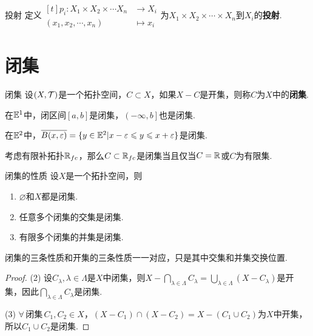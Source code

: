 \begin{definition}{投射}
    定义$\begin{aligned}[t]
        p_i: X_1\times X_2\times\cdots X_n &\to X_i \\
        (x_1,x_2,\cdots,x_n) &\mapsto x_i
    \end{aligned}$为$X_1\times X_2\times\cdots\times X_n$到$X_i$的\textbf{投射}.
\end{definition}

\section{闭集}

\begin{definition}{闭集}
    设$(X,\mathcal{T})$是一个拓扑空间，$C\subset X$，如果$X-C$是开集，则称$C$为$X$中的\textbf{闭集}.
\end{definition}

\begin{instance}
    在$\mathbb{E}^1$中，闭区间$\left[a,b\right]$是闭集，$\left(-\infty,b\right]$也是闭集.\par
    在$\mathbb{E}^2$中，$\overline{B(x,\varepsilon)}=\{y\in\mathbb{E}^2|x-\varepsilon\leqslant y\leqslant x+\varepsilon\}$是闭集.
\end{instance}

\begin{instance}
    考虑有限补拓扑$\mathbb{R}_{fc}$，那么$C\subset\mathbb{R}_{fc}$是闭集当且仅当$C=\mathbb{R}$或$C$为有限集.
\end{instance}


\begin{proposition}{闭集的性质}
    设$X$是一个拓扑空间，则
    \begin{enumerate}
        \item $\varnothing$和$X$都是闭集.
        \item 任意多个闭集的交集是闭集.
        \item 有限多个闭集的并集是闭集.
    \end{enumerate}
\end{proposition}
闭集的三条性质和开集的三条性质一一对应，只是其中交集和并集交换位置.
\begin{proof}
    (2) 设$C_\lambda,\lambda\in\Lambda$是$X$中闭集，则$X-\bigcap_{\lambda\in\Lambda}C_\lambda=\bigcup_{\lambda\in\Lambda}(X-C_\lambda)$是开集，因此$\bigcap_{\lambda\in\Lambda}C_\lambda$是闭集.\par
    (3) $\forall\, \text{闭集}\,C_1,C_2\in X$，$(X-C_1)\cap(X-C_2)=X-(C_1\cup C_2)$为$X$中开集，所以$C_1\cup C_2$是闭集.
\end{proof}


